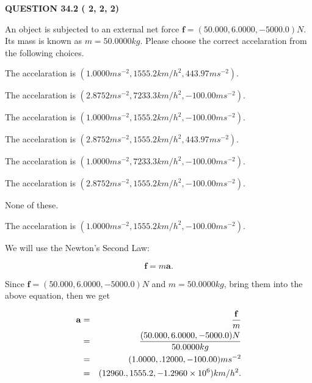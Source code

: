 \documentclass[12pt]{article}
\begin{document}
\vspace{0.2in}
  
{\textbf{\Large{QUESTION
34.2 
 (          2,          2,          2)
}}}
  
  
 
An object is subjected to an external net force $\mathbf{f}=(
50.000 ,
6.0000,
-5000.0  )N$. Its mass is known as
$m= %
50.0000  kg$. Please choose the correct accelaration
from the following choices.
 
 
 
The accelaration is
$(
1.0000ms^{-2},
1555.2km/h^2,
443.97ms^{-2}
).
$
 
 
The accelaration is
$(
2.8752ms^{-2},
7233.3km/h^2,
-100.00ms^{-2}
).
$
 
 
The accelaration is
$(
1.0000ms^{-2},
1555.2km/h^2,
-100.00ms^{-2}
).
$
 
 
The accelaration is
$(
2.8752ms^{-2},
1555.2km/h^2,
443.97ms^{-2}
).
$
 
 
The accelaration is
$(
1.0000ms^{-2},
7233.3km/h^2,
-100.00ms^{-2}
).
$
 
 
The accelaration is
$(
2.8752ms^{-2},
1555.2km/h^2,
-100.00ms^{-2}
).
$
 
 
 None of these.
 
 
\noindent{}
 
 
The accelaration is
$(
1.0000ms^{-2},
1555.2km/h^2,
-100.00ms^{-2}
).
$
 
 
\noindent{}
 
 
 
 
 
 
\noindent{}
 
 

We will use the Newton's Second Law:
 
\[
\mathbf{f}=m\mathbf{a}.
\]
 
Since $\mathbf{f}=( %
50.000,  %
6.0000,  %
-5000.0 )N$
and $m= %
50.0000kg$, bring them into the above equation, then we get
 
\begin{eqnarray*}
\mathbf{a}&=&\frac{\mathbf{f}}m  \\
&=&\frac{(
50.000 ,
6.0000 ,
-5000.0 )N
}{ %
50.0000 kg}  \\
&=&(
1.0000 ,
.12000,
-100.00
)ms^{-2} \\
&=&(
12960. ,
1555.2 ,
-1.2960 \times 10^{6}
)km/h^2.
\end{eqnarray*}
 
\end{document}
